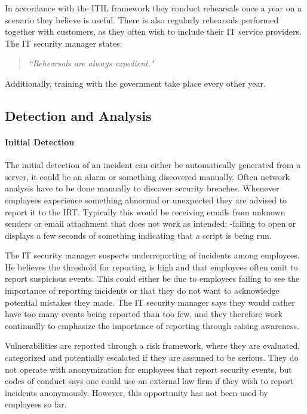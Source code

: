 In accordance with the ITIL framework they conduct rehearsals once a year on a scenario they believe is useful. There is also regularly rehearsals performed   together with customers, as they often wish to include their IT service providers. The IT security manager states:
\begin{quote}
\textit{``Rehearsals are always expedient."}
\end{quote}
Additionally, training with the government take place every other year. 

\subsection{Detection and Analysis}
\paragraph{Initial Detection}
The initial detection of an incident can either be automatically generated from a server, it could be an alarm or something discovered manually. Often network analysis have to be done manually to discover security breaches. Whenever employees experience something abnormal or unexpected they are advised to report it to the \ac{IRT}. Typically this would be receiving emails from unknown senders or email attachment that does not work as intended; -failing to open or displays a few seconds of something indicating that a script is being run.

The IT security manager suspects underreporting of incidents among employees. He believes the threshold for reporting is high and that employees often omit to report suspicious events. This could either be due to employees failing to see the importance of reporting incidents or that they do not want to acknowledge potential mistakes they made. The IT security manager says they would rather have too many events being reported than too few, and they therefore work continually to emphasize the importance of reporting through raising awareness.

Vulnerabilities are reported through a risk framework, where they are evaluated, categorized and potentially escalated if they are assumed to be serious. They do not operate with anonymization for employees that report security events, but codes of conduct says one could use an external law firm if they wish to report incidents anonymously. However, this opportunity has not been used by employees so far. 

